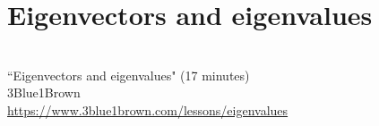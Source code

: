\section{Eigenvectors and eigenvalues}
\begin{bookfigure}
   \\
  ``Eigenvectors and eigenvalues" (17 minutes) \\
  \footnotesize 3Blue1Brown \\
  \url{https://www.3blue1brown.com/lessons/eigenvalues}
\end{bookfigure}
